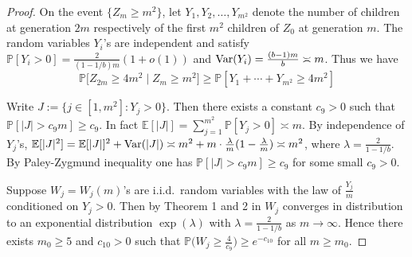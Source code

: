 \documentclass[12pt]{article}
\numberwithin{equation}{section}
\newcommand{\be}{\begin{equation}}
\newcommand{\ee}{\end{equation}}
\newcommand{\1}{\mathbf{1}}
\begin{document}
\begin{proof}
	On the event $\{Z_{m}\geq m^2\}$, let  $Y_1,Y_2,\ldots,Y_{m^2}$ denote the number of children at generation $2m$ respectively of the first $m^2$ children of $Z_0$ at generation $m$. 
	The random variables $Y_i$'s are independent and satisfy $\mathbb{P}[Y_i>0]=\frac{2}{(1-1/b)m}(1+o(1))$
	and $\textnormal{Var}(Y_i)=\frac{(b-1)m}{b}\asymp m$. Thus we have 
	\be\label{eq: Z_2m at least 4 times square of m bounded below in terms of Y_i}
	\mathbb{P}\big[Z_{2m}\geq 4m^2 \mid Z_{m}\geq m^2\big]\geq\mathbb{P}[Y_1+\cdots+Y_{m^2}\geq 4m^2]
	\ee
	
	
	Write $J:=\{j\in[1,m^2]\colon Y_j>0\}$. Then there exists a constant $c_9>0$
	such that $\mathbb{P}[|J|>c_9m]\geq c_9$. In fact $\mathbb{E}[|J|]=\sum_{j=1}^{m^2}\mathbb{P}[Y_j>0]\asymp m$. By independence of $Y_j$'s, $\mathbb{E}[|J|^2]=\mathbb{E}[|J|]^2+\textnormal{Var}(|J|)\asymp m^2+m\cdot\frac{\lambda}{m}(1-\frac{\lambda}{m})\asymp m^2$, where $\lambda=\frac{2}{1-1/b}$. By Paley-Zygmund inequality one has $\mathbb{P}[|J|>c_9m]\geq c_9$ for some small $c_9>0$.
	
Suppose  $W_j=W_j(m)$'s are i.i.d.\ random variables with  the law of $\frac{Y_j}{m}$ conditioned on $ Y_j>0$. Then by Theorem 1 and 2 in \cite[page 19-20]{AthreyaNey1972} $W_j$ converges in distribution to an exponential distribution $\exp(\lambda)$ with $\lambda=\frac{2}{1-1/b}$ as $m\rightarrow\infty$. Hence there exists $m_0\geq 5$ and $c_{10}>0$ such that $\mathbb{P}\big(W_j\geq \frac{4}{c_9}\big)\geq e^{-c_{10}}$ for all $m\geq m_0$. 


\end{proof}
\end{document}
